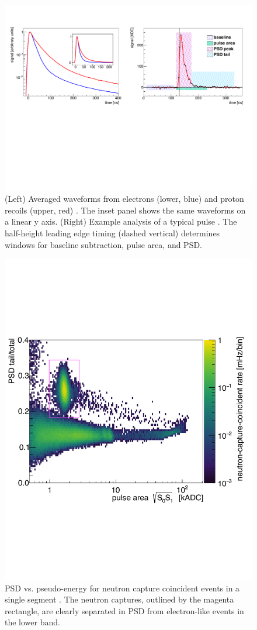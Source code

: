 \begin{figure}[t]
	\centering
	\includegraphics[width=0.99\linewidth]{tex/5-analysis-images/PSD_Define}
	\caption[Typical waveform]{(Left) Averaged waveforms from electrons (lower, blue) and proton recoils (upper, red) \cite{MM:2773}. The inset panel shows the same waveforms on a linear y axis. (Right) Example analysis of a typical pulse \cite{MM:2764}. The half-height leading edge timing (dashed vertical) determines windows for baseline subtraction, pulse area, and PSD. }
	\label{fig:psddefine}
\end{figure}

\begin{figure}[h]
	\centering
	\includegraphics[width=0.6\linewidth]{tex/5-analysis-images/PSD_vs_S}
	\caption[PSD vs. psuedo-energy for neutron coincident events]{PSD vs. pseudo-energy for neutron capture coincident events in a single segment \cite{MM:2731}. The neutron captures, outlined by the magenta rectangle, are clearly separated in PSD from electron-like events in the lower band.}
	\label{fig:psdvss}
\end{figure}


